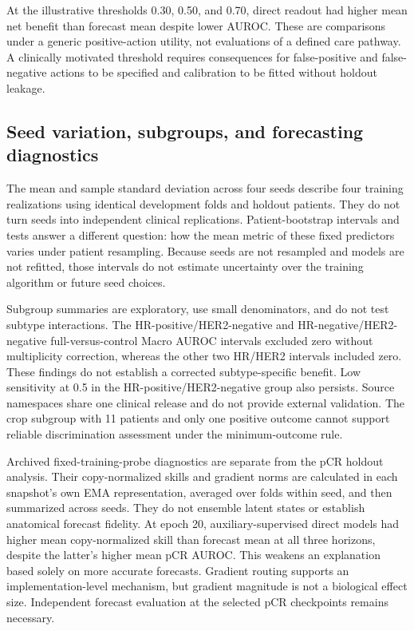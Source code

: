 At the illustrative thresholds 0.30, 0.50, and 0.70, direct readout had higher mean net benefit than forecast mean despite lower AUROC. These are comparisons under a generic positive-action utility, not evaluations of a defined care pathway. A clinically motivated threshold requires consequences for false-positive and false-negative actions to be specified and calibration to be fitted without holdout leakage.

\subsection{Seed variation, subgroups, and forecasting diagnostics}
The mean and sample standard deviation across four seeds describe four training realizations using identical development folds and holdout patients. They do not turn seeds into independent clinical replications. Patient-bootstrap intervals and tests answer a different question: how the mean metric of these fixed predictors varies under patient resampling. Because seeds are not resampled and models are not refitted, those intervals do not estimate uncertainty over the training algorithm or future seed choices.

Subgroup summaries are exploratory, use small denominators, and do not test subtype interactions. The HR-positive/HER2-negative and HR-negative/HER2-negative full-versus-control Macro AUROC intervals excluded zero without multiplicity correction, whereas the other two HR/HER2 intervals included zero. These findings do not establish a corrected subtype-specific benefit. Low sensitivity at 0.5 in the HR-positive/HER2-negative group also persists. Source namespaces share one clinical release and do not provide external validation. The crop subgroup with 11 patients and only one positive outcome cannot support reliable discrimination assessment under the minimum-outcome rule.

Archived fixed-training-probe diagnostics are separate from the pCR holdout analysis. Their copy-normalized skills and gradient norms are calculated in each snapshot's own EMA representation, averaged over folds within seed, and then summarized across seeds. They do not ensemble latent states or establish anatomical forecast fidelity. At epoch 20, auxiliary-supervised direct models had higher mean copy-normalized skill than forecast mean at all three horizons, despite the latter's higher mean pCR AUROC. This weakens an explanation based solely on more accurate forecasts. Gradient routing supports an implementation-level mechanism, but gradient magnitude is not a biological effect size. Independent forecast evaluation at the selected pCR checkpoints remains necessary.

